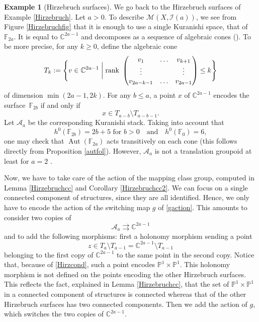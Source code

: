 \documentclass[10pt]{amsart}
\let\mathcal\mathscr
\DeclareMathOperator{\Aut}{Aut}
\theoremstyle{plain}
\theoremstyle{definition}
\newtheorem{example}[theorem]{Example}
\theoremstyle{remark}
\numberwithin{equation}{section}
\newcommand{\CC}{{\mathbb{C}}}
\newcommand{\cI}{\mathcal{I}}
\begin{document}
\begin{example}[Hirzebruch surfaces]
\label{Hirzebruchbis}
We go back to the Hirzebruch surfaces of Example \ref{Hirzebruch}. Let $a>0$. To describe $\mathcal M(X,\cI (a))$, we see from Figure \ref{Hirzebruchfig} that it is enough to use a single Kuranishi space, that of $\mathbb F_{2a}$. It is equal to $\CC^{2a-1}$ and decomposes as a sequence of algebraic cones (\cf \cite[p.\,21]{Cat}). To be more precise, for any $k\geq 0$, define the algebraic cone
\begin{equation}
\label{Tk}
T_k:=\Biggl\{v\in\CC^{2a-1}\biggm| \text{rank }
\begin{pmatrix}
v_1 &\hdots &v_{k+1}\cr
\vdots &&\vdots\cr
v_{2a-k-1} &\hdots &v_{2a-1}
\end{pmatrix}
\leq k
\Biggr \}
\end{equation}
of dimension $\min (2a-1, 2k)$. For any $b\leq a$, a point $x$ of $\CC^{2a-1}$ encodes the surface~$\mathbb F_{2b}$ if and only if
\begin{equation}
\label{Hirzcond}
x\in T_{a-b}\setminus T_{a-b-1}.
\end{equation}
Let $\mathcal A_a$ be the corresponding Kuranishi stack. Taking into account that
\begin{equation}
\label{hirzconst}
h^0(\mathbb F_{2b})=2b+5\text{ for }b>0\quad\text{and}\quad h^0(\mathbb F_0)=6,
\end{equation}
one may check that $\Aut(\mathbb F_{2a})$ acts transitively on each cone (this follows directly from Proposition \ref{autfol}). However, $\mathcal A_a$ is not a translation groupoid at least for $a=2$ \cite{An}.

Now, we have to take care of the action of the mapping class group, computed in Lemma \ref{Hirzebruchcc} and Corollary \ref{Hirzebruchcc2}. We can focus on a single connected component of structures, since they are all identified. Hence, we only have to encode the action of the switching map $g$ of \eqref{gaction}. This amounts to consider two copies of
\begin{equation}
\label{hirz12}
\mathcal A_a\rightrightarrows \CC^{2a-1}
\end{equation}
and to add the following morphisms: first a holonomy morphism sending a point
\begin{equation}
\label{hirzglu1}
z\in T_a\setminus T_{a-1}=\CC^{2a-1}\setminus T_{a-1}
\end{equation}
belonging to the first copy of $\CC^{2a-1}$ to the same point in the second copy. Notice that, because of \eqref{Hirzcond}, such a point encodes $\mathbb P^1\times\mathbb P^1$. This holonomy morphism is not defined on the points encoding the other Hirzebruch surfaces. This reflects the fact, explained in Lemma \ref{Hirzebruchcc}, that the set of $\mathbb P^1\times\mathbb P^1$ in a connected component of structures is connected whereas that of the other Hirzebruch surfaces has two connected components. Then we add the action of $g$, which switches the two copies of $\CC^{2a-1}$.


\end{example}
\end{document}
